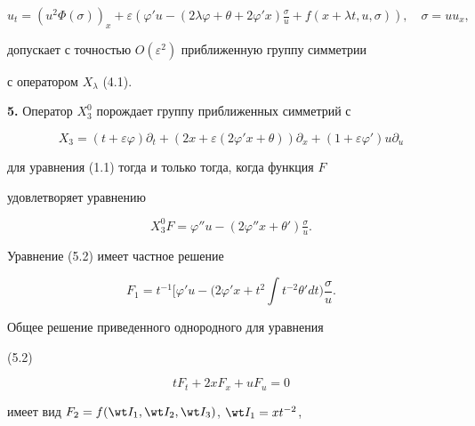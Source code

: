 \begin{equation} 


u_t=(u^2\Phi(\sigma))_x+\varepsilon 


(\varphi'u-(2\lambda\varphi+\theta+2\varphi'x) 


\tfrac{\sigma}{u}+f(x+\lambda t,u,\sigma)),\quad 


\sigma=u u_x, \tag{4.2} 


\end{equation} 


допускает с точностью $O(\varepsilon^2)$ приближенную группу симметрии 


с оператором $X_\lambda$ (4.1). 


\medskip 


 


{\bf 5.} Оператор $X^0_3$ порождает группу приближенных симметрий с 


\begin{equation} 


X_3=(t+\varepsilon\varphi)\partial_t+ 


(2x+\varepsilon(2\varphi'x+\theta))\partial_x+ 


(1+\varepsilon\varphi')u\partial_u \tag{5.1} 


\end{equation} 


для уравнения (1.1) тогда и только тогда, когда функция $F$ 


удовлетворяет уравнению 


\begin{equation} 


X^0_3F=\varphi''u-(2\varphi''x+\theta')\tfrac{\sigma}{u}.\tag{5.2} 


\end{equation} 


Уравнение (5.2) имеет частное решение 


$$ 


F_1=t^{-1}\bigg[\varphi'u-\Big(2\varphi'x+t^2\int 


t^{-2}\theta'dt\Big)\frac{\sigma}{u}. 


$$ 


Общее решение приведенного однородного для уравнения 


(5.2) 


$$ 


t F_t+2x F_x+u F_u=0 


$$ 


имеет вид $F_2=f(\wt I_1,\wt I_2,\wt I_3)$, $\wt I_1=x t^{-2}$, 


